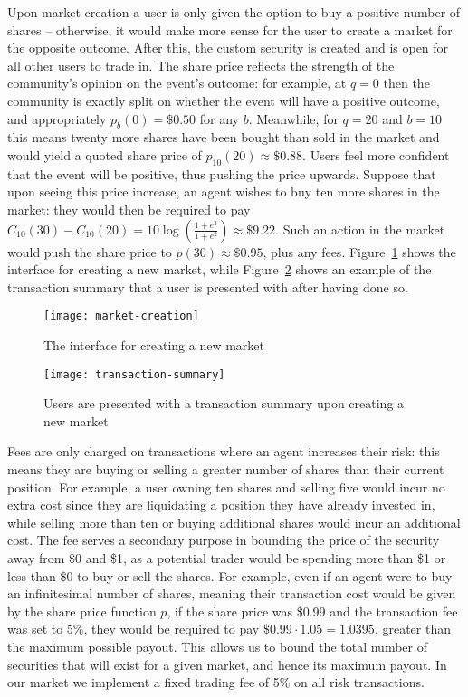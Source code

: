 Upon market creation a user is only given the option to buy a positive number
of shares -- otherwise, it would make more sense for the user to create a
market for the opposite outcome. After this, the custom security is created and
is open for all other users to trade in. The share price reflects the strength
of the community's opinion on the event's outcome: for example, at $q=0$ then
the community is exactly split on whether the event will have a positive
outcome, and appropriately $p_b(0)=\$0.50$ for any $b$. Meanwhile, for $q=20$
and $b=10$ this means twenty more shares have been bought than sold in the
market and would yield a quoted share price of $p_{10}(20) \approx \$0.88$.
Users feel more confident that the event will be positive, thus pushing the
price upwards. Suppose that upon seeing this price increase, an agent wishes to
buy ten more shares in the market: they would then be required to pay
$C_{10}(30)-C_{10}(20)=10 \log (\frac{1+e^3}{1+e^2}) \approx \$9.22$. Such an
action in the market would push the share price to $p(30) \approx \$0.95$, plus
any fees. Figure~\ref{fig:marketCreation} shows the interface for creating a
new market, while Figure~\ref{fig:transactionSummary} shows an example of the
transaction summary that a user is presented with after having done so.

\begin{figure}[h]
	\centering
	\texttt{[image: market-creation]}
	\caption{The interface for creating a new market}
	\label{fig:marketCreation}
\end{figure}

\begin{figure}[h]
	\centering
	\texttt{[image: transaction-summary]}
	\caption{Users are presented with a transaction summary upon creating a new
	market}
	\label{fig:transactionSummary}
\end{figure}

Fees are only charged on transactions where an agent increases their risk: this
means they are buying or selling a greater number of shares than their current
position. For example, a user owning ten shares and selling five would incur no
extra cost since they are liquidating a position they have already invested in,
while selling more than ten or buying additional shares would incur an
additional cost. The fee serves a secondary purpose in bounding the price of
the security away from \$0 and \$1, as a potential trader would be spending
more than \$1 or less than \$0 to buy or sell the shares. For example, even if
an agent were to buy an infinitesimal number of shares, meaning their
transaction cost would be given by the share price function $p$, if the share
price was \$0.99 and the transaction fee was set to 5\%, they would be required
to pay $\$0.99 \cdot 1.05 = 1.0395$, greater than the maximum possible payout.
This allows us to bound the total number of securities that will exist for a
given market, and hence its maximum payout.  In our market we implement a fixed
trading fee of 5\% on all risk transactions.

